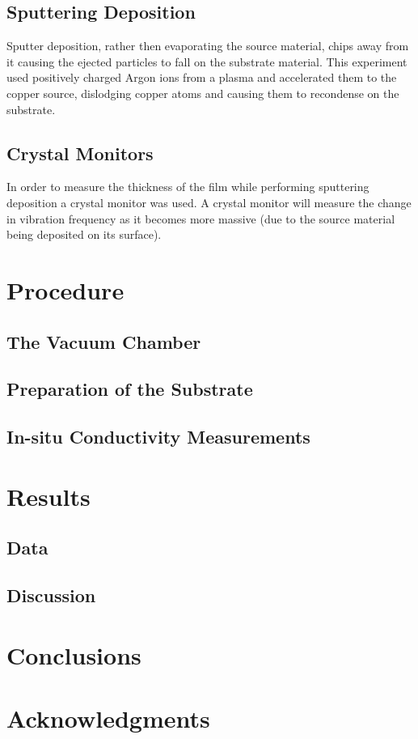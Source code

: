 \documentclass[aps,prl,twocolumn,groupedaddress,showkeys]{revtex4}
\begin{document}
\subsection{Sputtering Deposition}

Sputter deposition, rather then evaporating the source material, chips away from it causing the ejected particles to fall on the substrate material. This experiment used positively charged Argon ions from a plasma and accelerated them to the copper source, dislodging copper atoms and causing them to recondense on the substrate.


\subsection{Crystal Monitors}

In order to measure the thickness of the film while performing sputtering deposition a crystal monitor was used. A crystal monitor will measure the change in vibration frequency as it becomes more massive (due to the source material being deposited on its surface).


\section{Procedure}

\subsection{The Vacuum Chamber}

\subsection{Preparation of the Substrate}

\subsection{In-situ Conductivity Measurements}



\section{Results}

\subsection{Data}

\subsection{Discussion}

\section{Conclusions}

\section{Acknowledgments}
\end{document}
